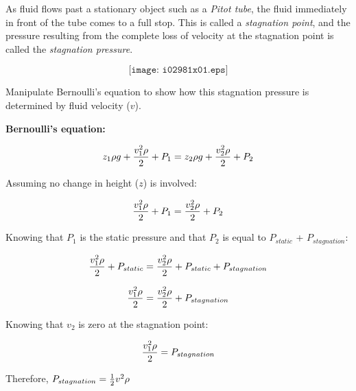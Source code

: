 

As fluid flows past a stationary object such as a {\it Pitot tube}, the fluid immediately in front of the tube comes to a full stop.  This is called a {\it stagnation point}, and the pressure resulting from the complete loss of velocity at the stagnation point is called the {\it stagnation pressure}.

$$\texttt{[image: i02981x01.eps]}$$

Manipulate Bernoulli's equation to show how this stagnation pressure is determined by fluid velocity ($v$).







\noindent
{\bf Bernoulli's equation:}

$$z_1 \rho g + {v_1^2 \rho \over 2} + P_1 = z_2 \rho g + {v_2^2 \rho \over 2} + P_2$$

Assuming no change in height ($z$) is involved:

$${v_1^2 \rho \over 2} + P_1 = {v_2^2 \rho \over 2} + P_2$$

Knowing that $P_1$ is the static pressure and that $P_2$ is equal to $P_{static}$ + $P_{stagnation}$:

$${v_1^2 \rho \over 2} + P_{static} = {v_2^2 \rho \over 2} + P_{static} + P_{stagnation}$$

$${v_1^2 \rho \over 2} = {v_2^2 \rho \over 2} + P_{stagnation}$$

Knowing that $v_2$ is zero at the stagnation point:

$${v_1^2 \rho \over 2} = P_{stagnation}$$

\vskip 10pt

Therefore, $P_{stagnation} = {1 \over 2} v^2 \rho$











